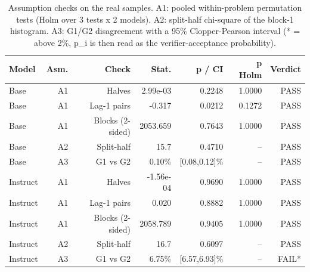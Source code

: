 \begin{table}[t]
\centering
\small
\begin{tabular}{lrrrrrr}
\toprule
Model & Asm. & Check & Stat. & p / CI & p Holm & Verdict \\
\midrule
Base & A1 & Halves & 2.99e-03 & 0.2248 & 1.0000 & PASS \\
Base & A1 & Lag-1 pairs & -0.317 & 0.0212 & 0.1272 & PASS \\
Base & A1 & Blocks (2-sided) & 2053.659 & 0.7643 & 1.0000 & PASS \\
Base & A2 & Split-half & 15.7 & 0.4710 & -- & PASS \\
Base & A3 & G1 vs G2 & 0.10\% & [0.08,0.12]\% & -- & PASS \\
Instruct & A1 & Halves & -1.56e-04 & 0.9690 & 1.0000 & PASS \\
Instruct & A1 & Lag-1 pairs & 0.020 & 0.8882 & 1.0000 & PASS \\
Instruct & A1 & Blocks (2-sided) & 2058.789 & 0.9405 & 1.0000 & PASS \\
Instruct & A2 & Split-half & 16.7 & 0.6097 & -- & PASS \\
Instruct & A3 & G1 vs G2 & 6.75\% & [6.57,6.93]\% & -- & FAIL* \\
\bottomrule
\end{tabular}
\caption{Assumption checks on the real samples. A1: pooled within-problem permutation tests (Holm over 3 tests x 2 models). A2: split-half chi-square of the block-1 histogram. A3: G1/G2 disagreement with a 95\% Clopper-Pearson interval (* = above 2\%, p\_i is then read as the verifier-acceptance probability).}
\label{tab:T1_assumption_tests}
\end{table}
